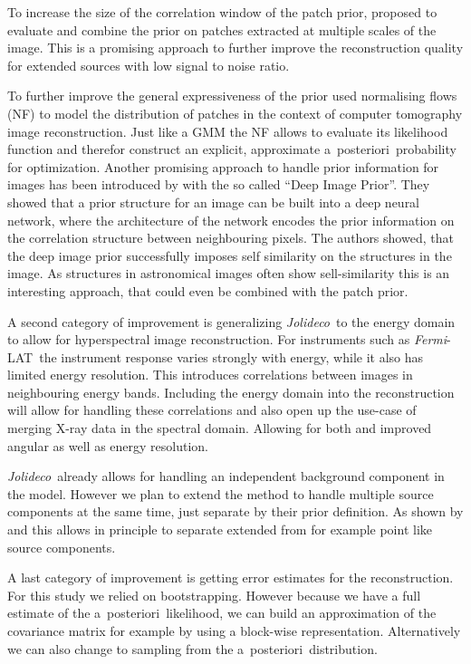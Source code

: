 \documentclass[twocolumn]{aastex631}
\newcommand{\fermi}{\textit{Fermi}-LAT~}
\newcommand{\jolideco}{\textit{Jolideco}~}
\newcommand{\aposteriori}{a~posteriori~}
\newcommand{\xray}{X-ray\xspace}
\begin{document}
    To increase the size of the correlation window of the patch prior, \cite{Papyan2015} proposed to evaluate and combine the prior on patches extracted at multiple scales of the image. This is a promising approach to further improve the reconstruction quality for extended sources with low signal to noise ratio.
    
    To further improve the general expressiveness of the prior \cite{Altekrueger2022} used normalising flows (NF) to model the distribution of patches in the context of computer tomography image reconstruction. Just like a GMM the NF allows to evaluate its likelihood function and therefor construct an explicit, approximate \aposteriori probability for optimization. 
    Another promising approach to handle prior information for images has been introduced by \citep{Ulyanov2017} with the so called \enquote{Deep Image Prior}. They showed that a prior structure for an image can be built into a deep neural network, where the architecture of the network encodes the prior information on the correlation structure between neighbouring pixels. The authors showed, that the deep image prior successfully imposes self similarity on the structures in the image. As structures in astronomical images often show sell-similarity this is an interesting approach, that could even be combined with the patch prior.

    A second category of improvement is generalizing \jolideco to the energy domain to allow for hyperspectral image reconstruction. For instruments such as \fermi the instrument response varies strongly with energy, while it also has limited energy resolution. This introduces correlations between images in neighbouring energy bands. Including the energy domain into the reconstruction will allow for handling these correlations and also open up the use-case of merging \xray data in the spectral domain. Allowing for both  and improved angular as well as energy resolution. 

    \jolideco already allows for handling an independent background component in the model. However we plan to extend the method to handle multiple source components at the same time, just separate by their prior definition. As shown by \cite{Selig2015} and \citep{Pumpe2018} this allows in principle to separate extended from for example point like source components.

    A last category of improvement is getting error estimates for the reconstruction. For this study we relied on bootstrapping. However because we have a full estimate of the \aposteriori likelihood, we can build an approximation of the covariance matrix for example by using a block-wise representation. Alternatively we can also change to sampling from the \aposteriori distribution. 
    
\end{document}
